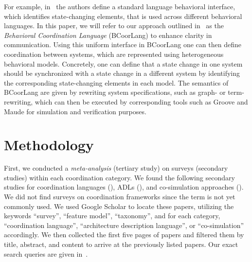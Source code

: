 \documentclass[runningheads]{llncs}
\newcommand{\quotes}[1]{``#1''}
\begin{document}
For example, in~\cite{krauterBehavioralConsistencyMultimodeling2023} the authors define a standard language behavioral interface, which identifies state-changing elements, that is used across different behavioral languages.
In this paper, we will refer to our approach outlined in~\cite{krauterBehavioralConsistencyMultimodeling2023} as the \textit{Behavioral Coordination Language} (BCoorLang) to enhance clarity in communication.
Using this uniform interface in BCoorLang one can then define coordination between systems, which are represented using heterogeneous behavioral models.
Concretely, one can define that a state change in one system should be synchronized with a state change in a different system by identifying the corresponding state-changing elements in each model.
The semantics of BCoorLang are given by rewriting system specifications, such as graph- or term-rewriting, which can then be executed by corresponding tools such as Groove \cite{rensinkGROOVESimulatorTool2004} and Maude \cite{manuelclavelAllMaudeHighPerformance2007} for simulation and verification purposes.

\section{Methodology} \label{sec: methodology}

First, we conducted a \textit{meta-analysis} (tertiary study) on surveys (secondary studies) within each coordination category.
We found the following  secondary studies for coordination languages (\cite{papadopoulosCoordinationModelsLanguages1998,goosCoordinationModelsLanguages2001,rossiTuplebasedTechnologiesCoordination2001}), ADLs (\cite{clementsSurveyArchitectureDescription1996,medvidovicClassificationComparisonFramework2000,hussainInvestigatingArchitectureDescription2013,ozkayaAreWeThere2013,malavoltaWhatIndustryNeeds2013}), and co-simulation approaches (\cite{gomesCoSimulationSurvey2019,schweigerEmpiricalSurveyCosimulation2019,hafnerOverviewStateArt2021}).
We did not find surveys on coordination frameworks since the term is not yet commonly used.
We used Google Scholar to locate these papers, utilizing the keywords \quotes{survey}, \quotes{feature model}, \quotes{taxonomy}, and for each category, \quotes{coordination language}, \quotes{architecture description language}, or \quotes{co-simulation} accordingly.
We then collected the first five pages of papers and filtered them by title, abstract, and content to arrive at the previously listed papers.
Our exact search queries are given in~\cite{timkrauterArtifactsCoordination2024}.
\end{document}
